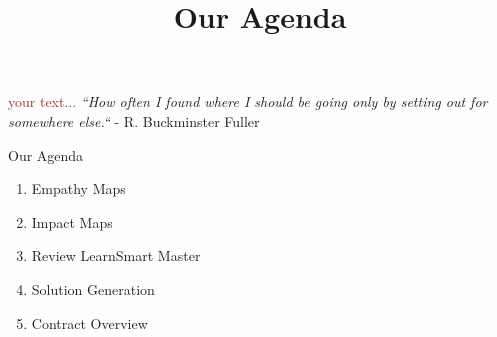 \documentclass{ximera}
\title{Our Agenda}
\begin{document}
\begin{abstract}

\end{abstract}
\maketitle

\textcolor{brown}{your text...}
\emph{``How often I found where I should be going only by setting out for somewhere else.``} - R. Buckminster Fuller

Our Agenda
\begin{enumerate}
  \item Empathy Maps
  \item Impact Maps
  \item Review LearnSmart Master
  \item Solution Generation
  \item Contract Overview
\end{enumerate}
\end{document}
